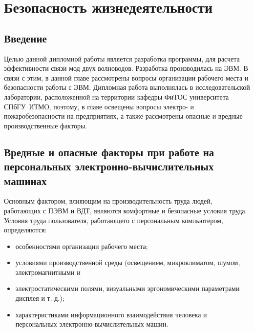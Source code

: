 \chapter{Безопасность жизнедеятельности}

\section{Введение}
Целью данной дипломной работы является разработка программы, для расчета эффективности связи мод двух волноводов. Разработка производилась на ЭВМ. В связи с этим, в данной главе рассмотрены вопросы организации рабочего места и безопасности работы с ЭВМ. Дипломная работа выполнялась в исследовательской лаборатории, расположенной на территории кафедры ФиТОС университета СПбГУ~ИТМО, поэтому, в главе освещены вопросы электро- и пожаробезопасности на предприятиях, а также рассмотрены опасные и вредные производственные факторы.

\section{Вредные и опасные факторы при работе на персональных электронно-вычислительных машинах}

Основным фактором, влияющим на производительность труда людей, работающих с ПЭВМ и ВДТ, являются комфортные и безопасные условия труда. Условия труда пользователя, работающего с персональным компьютером, определяются:
\begin{itemize}
	\item особенностями организации рабочего места;
	\item условиями производственной среды (освещением, микроклиматом, шумом, электромагнитными и 			\item электростатическими полями, визуальными эргономическими параметрами дисплея и т. д.);
	\item характеристиками информационного взаимодействия человека и персональных электронно-вычислительных машин.
\end{itemize}

